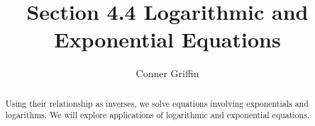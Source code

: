\documentclass{ximera}
\title{Section 4.4 Logarithmic and Exponential Equations}
\author{Conner Griffin}
\begin{document}
    \begin{abstract}
        Using their relationship as inverses, we solve equations involving exponentials and logarithms. We will explore applications of logarithmic and exponential equations.
    \end{abstract}
    \maketitle

    
    
\end{document}
